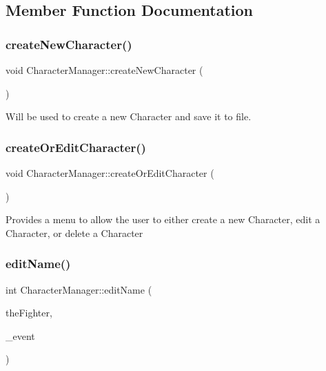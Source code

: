 \subsection{Member Function Documentation}
\hypertarget{class_character_manager_a0ca49607713616f15b70b12df1597100}{}\label{class_character_manager_a0ca49607713616f15b70b12df1597100} 
\subsubsection{\texorpdfstring{create\+New\+Character()}{createNewCharacter()}}
{\footnotesize\ttfamily void Character\+Manager\+::create\+New\+Character (\begin{DoxyParamCaption}{ }\end{DoxyParamCaption})\hspace{0.3cm}{\ttfamily [static]}}

Will be used to create a new Character and save it to file. \hypertarget{class_character_manager_adec8bcfbce9bbb46052655e75d8f496f}{}\label{class_character_manager_adec8bcfbce9bbb46052655e75d8f496f} 
\subsubsection{\texorpdfstring{create\+Or\+Edit\+Character()}{createOrEditCharacter()}}
{\footnotesize\ttfamily void Character\+Manager\+::create\+Or\+Edit\+Character (\begin{DoxyParamCaption}{ }\end{DoxyParamCaption})\hspace{0.3cm}{\ttfamily [static]}}

Provides a menu to allow the user to either create a new Character, edit a Character, or delete a Character \hypertarget{class_character_manager_a185baadd16768d6b81386c7987593c5a}{}\label{class_character_manager_a185baadd16768d6b81386c7987593c5a} 
\subsubsection{\texorpdfstring{edit\+Name()}{editName()}}
{\footnotesize\ttfamily int Character\+Manager\+::edit\+Name (\begin{DoxyParamCaption}\item[{\hyperlink{class_fighter}{Fighter} $\ast$}]{the\+Fighter,  }\item[{S\+D\+L\+\_\+\+Event}]{\+\_\+event }\end{DoxyParamCaption})\hspace{0.3cm}{\ttfamily [static]}}

